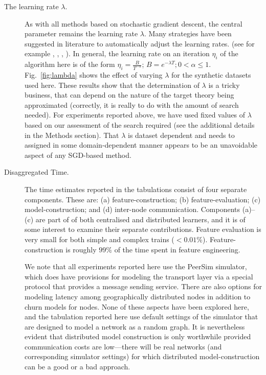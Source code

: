\begin{description}
    \item[The learning rate $\lambda$.] As with all methods based on stochastic gradient descent,
            the central parameter remains the learning rate $\lambda$. 
                Many strategies have been suggested in literature to automatically adjust the
            learning rates.
        (see for example
        \cite{bottou-2010}, \cite{bottou-bousquet-2011}, \cite{Darken_90}, \cite{Sutton_92}).
        In general, the learning rate on an iteration $\eta_i$ of the algorithm here is of the form $\eta_i = \frac{B}{T^{-\alpha}}$;
        $B=e^{-\lambda T}; 0 < \alpha \le 1$. Fig.~\ref{fig:lambda} shows the effect
        of varying $\lambda$ for the synthetic datasets used here.
        These results show that the
        determination of $\lambda$ is a tricky business, that can depend on the
        nature of the target theory being approximated (correctly, it
        is really to do with the amount of search needed).
        For experiments reported above, we have used fixed values
        of $\lambda$ based on our assessment of the search required
        (see the additional details in the Methods section).
        That $\lambda$ is dataset dependent and needs to
        assigned in some domain-dependent
        manner appears to be an unavoidable aspect of any SGD-based method.
  \item[Disaggregated Time.] The time estimates reported in the tabulations consist
        of four separate components. These are: (a) feature-construction;
        (b) feature-evaluation; (c) model-construction; and (d) inter-node communication.
        Components (a)--(c) are part of
        of both centralised and distributed learners, and it is of some interest
        to examine their separate contributions. %
        Feature evaluation is very small for both simple and complex trains ($<0.01\%$). Feature-construction is roughly $99\%$ of the time spent in feature engineering.
        
        We note that all experiments reported here use the PeerSim simulator,
        which does have provisions for modeling the transport layer
        via a special protocol that provides a message sending service.
        There are also options for modeling latency among geographically distributed nodes in
        addition to churn models for nodes. None of these aspects have been
        explored here, and the tabulation reported here use default
        settings of the simulator that are designed to model a network as a random graph.
        It is nevertheless evident that distributed
        model construction is only worthwhile provided communication costs are
        low---there will be real networks (and corresponding simulator settings)
        for which distributed model-construction can be a good or a
        bad approach.
        

\end{description}

